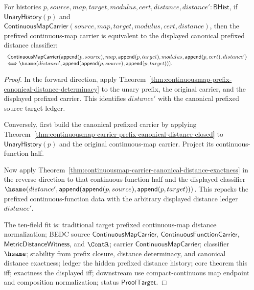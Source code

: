 \begin{theorem}
\label{thm:continuousmap-prefix-canonical-distance-exactness}
For histories
$p,source,map,target,modulus,cert,distance,distance':\mathsf{BHist}$, if
$\mathsf{UnaryHistory}(p)$ and
$\mathsf{ContinuousMapCarrier}(source,map,target,modulus,cert,distance)$,
then the prefixed continuous-map carrier is equivalent to the displayed
canonical prefixed distance classifier:
$$
\begin{array}{l}
\mathsf{ContinuousMapCarrier}
(\mathsf{append}(p,source),map,\mathsf{append}(p,target),modulus,
\mathsf{append}(p,cert),distance')\\
\Longleftrightarrow
\hsame(distance',
\mathsf{append}(\mathsf{append}(p,source),\mathsf{append}(p,target))).
\end{array}
$$
\end{theorem}
\begin{proof}
In the forward direction, apply
Theorem~\ref{thm:continuousmap-prefix-canonical-distance-determinacy} to the
unary prefix, the original carrier, and the displayed prefixed carrier. This
identifies $distance'$ with the canonical prefixed source-target ledger.

Conversely, first build the canonical prefixed carrier by applying
Theorem~\ref{thm:continuousmap-carrier-prefix-canonical-distance-closed} to
$\mathsf{UnaryHistory}(p)$ and the original continuous-map carrier. Project
its continuous-function half.

Now apply
Theorem~\ref{thm:continuousmap-carrier-canonical-distance-exactness} in the
reverse direction to that continuous-function half and the displayed
classifier
$\hsame(distance',
\mathsf{append}(\mathsf{append}(p,source),\mathsf{append}(p,target)))$.
This repacks the prefixed continuous-function data with the arbitrary
displayed distance ledger $distance'$.

The ten-field fit is: traditional target prefixed continuous-map distance
normalization; BEDC source $\mathsf{ContinuousMapCarrier}$,
$\mathsf{ContinuousFunctionCarrier}$, $\mathsf{MetricDistanceWitness}$, and
$\ContR$; carrier $\mathsf{ContinuousMapCarrier}$; classifier $\hsame$;
stability from prefix closure, distance determinacy, and canonical distance
exactness; ledger the hidden prefixed distance history; core theorem this iff;
exactness the displayed iff; downstream use compact-continuous map endpoint
and composition normalization; status $\mathsf{ProofTarget}$.
\end{proof}

